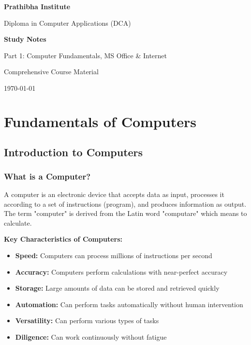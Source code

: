 \documentclass[12pt,a4paper]{article}
\begin{document}
\begin{titlepage}
    \centering
    \vspace*{2cm}
    {\Huge\bfseries Prathibha Institute\par}
    \vspace{1cm}
    {\Large Diploma in Computer Applications (DCA)\par}
    \vspace{1.5cm}
    {\LARGE\bfseries Study Notes\par}
    \vspace{0.5cm}
    {\Large Part 1: Computer Fundamentals, MS Office \& Internet\par}
    \vfill
    {\large Comprehensive Course Material\par}
    \vspace{0.5cm}
    {\large \today\par}
\end{titlepage}

\tableofcontents
\newpage


\section{Fundamentals of Computers}

\subsection{Introduction to Computers}

\subsubsection{What is a Computer?}
A computer is an electronic device that accepts data as input, processes it according to a set of instructions (program), and produces information as output. The term "computer" is derived from the Latin word "computare" which means to calculate.

\textbf{Key Characteristics of Computers:}
\begin{itemize}[leftmargin=*]
    \item \textbf{Speed:} Computers can process millions of instructions per second
    \item \textbf{Accuracy:} Computers perform calculations with near-perfect accuracy
    \item \textbf{Storage:} Large amounts of data can be stored and retrieved quickly
    \item \textbf{Automation:} Can perform tasks automatically without human intervention
    \item \textbf{Versatility:} Can perform various types of tasks
    \item \textbf{Diligence:} Can work continuously without fatigue
\end{itemize}
\end{document}

